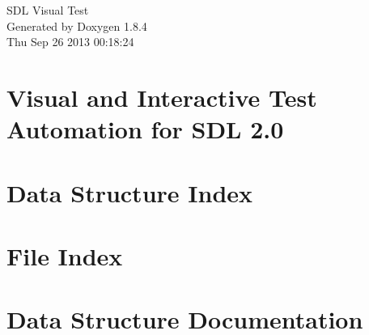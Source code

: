 \documentclass[twoside]{book}
\newcommand{\clearemptydoublepage}{%
  \newpage{\pagestyle{empty}\cleardoublepage}%
}
\begin{document}
\hypersetup{pageanchor=false}
\begin{titlepage}
\vspace*{7cm}
\begin{center}%
{\Large S\-D\-L Visual Test }\\
\vspace*{1cm}
{\large Generated by Doxygen 1.8.4}\\
\vspace*{0.5cm}
{\small Thu Sep 26 2013 00:18:24}\\
\end{center}
\end{titlepage}
\clearemptydoublepage
\tableofcontents
\clearemptydoublepage
{}
\hypersetup{pageanchor=true}

\chapter{Visual and Interactive Test Automation for S\-D\-L 2.0}
\label{index}\hypertarget{index}{}
\chapter{Data Structure Index}

\chapter{File Index}

\chapter{Data Structure Documentation}















\end{document}
